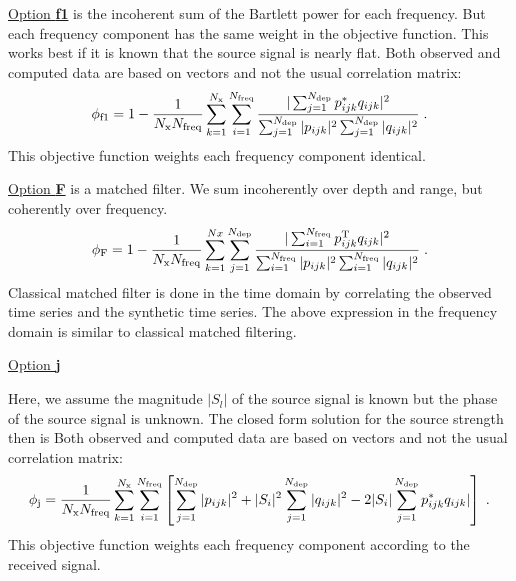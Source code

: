 \documentclass{saclantc}
\begin{document}
 \underline{Option {\bf f1}}
is the incoherent sum of the Bartlett power for each frequency. But
each frequency component has the same weight in the objective
function. This works best if it is known that the source signal is
nearly flat.
Both observed and computed data  are based on 
vectors and not  the usual correlation matrix: 
\begin{equation}
 \phi_{\rm f1}= 1- \frac{1}{N_{\rm x}{N _{\rm freq}}}
  \sum^{N_{\rm x}}_{k=1} \sum^{N _{\rm freq}}_{i=1} 
{{|\sum^{N _{\rm dep}}_{j=1} {p}_{ijk}^{\rm *} {q}_{ijk}|^2}
      \over {\sum^{N _{\rm dep}}_{j=1} |{p}_{ijk}|^2
             \sum^{N _{\rm dep}}_{j=1} |{q}_{ijk}|^2}}
  \; .
\label{eq:objf1}
\end{equation}
This objective function weights each frequency component identical.

\underline{Option {\bf F}}  is a matched filter. We sum
incoherently over depth and range, but coherently over frequency.
\begin{equation}
 \phi_{\rm F}= 1- \frac{1}{N_{\rm x}{N _{\rm freq}}}
  \sum^{Nx}_{k=1} \sum^{N _{\rm dep}}_{j=1} 
{{|\sum^{N _{\rm freq}}_{i=1} {p}_{ijk}^{\rm T}{q}_{ijk}|^2}
      \over {\sum^{N_{ \rm freq}}_{i=1} |{p}_{ijk}|^2
             \sum^{N _{\rm freq}}_{i=1} |{q}_{ijk}|^2}}
  \; .
\label{eq:objF}
\end{equation}
Classical matched filter is done in the time domain by correlating the
observed time series and the synthetic time series. The above expression in the frequency domain is similar to
classical matched filtering. 

\underline{Option {\bf j}}

Here, we assume the magnitude $|S_l |$ of the
source signal is  known but the phase of the source signal is unknown. 
The closed form solution for the source strength then is 
Both observed and computed data  are based on 
vectors and not  the usual correlation matrix: 
\begin{equation}
 \phi_{\rm j}= \frac{1}{N_{\rm x}{N _{\rm freq}}}
  \sum^{N_{\rm x}}_{k=1} \sum^{N _{\rm freq}}_{i=1} \left[
            \sum^{N _{\rm dep}}_{j=1} |{p}_{ijk}|^2 
   +|S_i|^2 \sum^{N _{\rm dep}}_{j=1} |{q}_{ijk}|^2
 -2|S_i {|\sum^{N _{\rm dep}}_{j=1} {p}_{ijk}^{\rm *} {q}_{ijk}|}
      \right]
  \; .
\label{eq:objj}
\end{equation}
This objective function weights each frequency component according to
the received signal.
\end{document}
